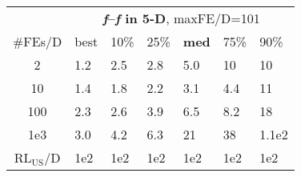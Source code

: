 \begin{tabular}{c|llllll}
 & \multicolumn{6}{|c}{\textbf{\textit{f}\raisebox{-0.35ex}{1}--\textit{f}\raisebox{-0.35ex}{24} in 5-D}, maxFE/D=101}\\
\#FEs/D & best & 10\% & 25\% & \textbf{med} & 75\% & 90\%\\
2 & \hspace*{1ex}1.2 & \hspace*{1ex}2.5 & \hspace*{1ex}2.8 & \hspace*{1ex}5.0 & 10 & 10\\
10 & \hspace*{1ex}1.4 & \hspace*{1ex}1.8 & \hspace*{1ex}2.2 & \hspace*{1ex}3.1 & \hspace*{1ex}4.4 & 11\\
100 & \hspace*{1ex}2.3 & \hspace*{1ex}2.6 & \hspace*{1ex}3.9 & \hspace*{1ex}6.5 & \hspace*{1ex}8.2 & 18\\
1e3 & \hspace*{1ex}3.0 & \hspace*{1ex}4.2 & \hspace*{1ex}6.3 & 21 & 38 & 1.1e2\\
$\text{RL}_{\text{US}}$/D & 1e2 & 1e2 & 1e2 & 1e2 & 1e2 & 1e2
\end{tabular}

